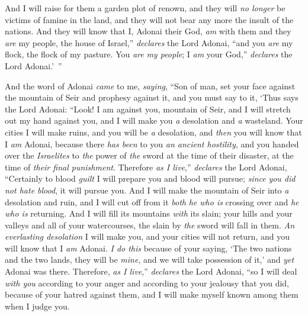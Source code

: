 \begin{biblechapter}
\verse And I will raise for them a garden plot of renown, and they will \textit{no longer} be victims of famine in the land, and they will not bear any more the insult of the nations.
\verse And they will know that I, Adonai their God, \textit{am} with them and they \textit{are} my people, the house of Israel,” \textit{declares} the Lord Adonai,
\verse “and you \textit{are} my flock, the flock of my pasture. You \textit{are} \textit{my people}; I \textit{am} your God,” \textit{declares} the Lord Adonai.’ ”
\end{biblechapter}

\begin{biblechapter} %
 And the word of Adonai \textit{came} to me, \textit{saying},
\verse “Son of man, set your face against the mountain of Seir and prophesy against it,
\verse and you must say to it, ‘Thus says the Lord Adonai: “Look! I am against you, mountain of Seir, and I will stretch out my hand against you, and I will make you \textit{a} desolation and \textit{a} wasteland.
\verse Your cities I will make ruins, and you will be \textit{a} desolation, and \textit{then} you will know that I \textit{am} Adonai,
\verse because there \textit{has been} to you \textit{an ancient hostility}, and you handed over the \textit{Israelites} to \textit{the} power of \textit{the} sword at the time of their disaster, at the time of \textit{their final punishment}.
\verse Therefore \textit{as I live},” \textit{declares} the Lord Adonai, “Certainly to blood \textit{guilt} I will prepare you and blood will pursue; \textit{since} \textit{you did not hate blood}, it will pursue you.
\verse And I will make the mountain of Seir into \textit{a} desolation and ruin, and I will cut off from it \textit{both} \textit{he who is} crossing over and \textit{he who is} returning.
\verse And I will fill its mountains \textit{with} its slain; your hills and your valleys and all of your watercourses, the slain by \textit{the} sword will fall in them.
\verse \textit{An everlasting desolation} I will make you, and your cities will not return, and you will know that I \textit{am} Adonai.
\verse \textit{I do this} because of your saying, ‘The two nations and the two lands, they will be \textit{mine}, and we will take possession of it,’ and \textit{yet} Adonai was there.
\verse Therefore, \textit{as I live},” \textit{declares} the Lord Adonai, “so I will deal \textit{with you} according to your anger and according to your jealousy that you did, because of your hatred against them, and I will make myself known among them when I judge you.

\end{biblechapter}
